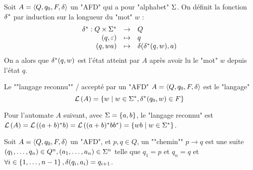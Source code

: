 \begin{definition}
	Soit $A = \langle Q, q_0, F, \delta \rangle$ un "AFD" qui a pour "alphabet" $\Sigma$. On définit la fonction $\delta^{*}$ par induction sur la longueur du "mot" $w$ :
	$$ \begin{array}{rcl}
			\delta^{*} : Q \times \Sigma^{*} & \to     & Q                               \\
			(q, \varepsilon)                   & \mapsto & q                               \\
			(q, wa)                         & \mapsto & \delta(\delta^{*}(q, w), a)
		\end{array} $$
	On a alors que $\delta^{*}(q, w)$ est l'état atteint par $A$ après avoir lu le "mot" $w$ depuis l'état $q$.
\end{definition}

\begin{definition}
	Le ""langage reconnu"" / accepté par un "AFD" $A = \langle Q, q_0, F, \delta \rangle$ est le "langage"
	$$ \mathcal{L}\left(A\right) = \left\{w \mid w \in \Sigma^{*}, \delta^{*}(q_0, w) \in F\right\} $$
\end{definition}

\begin{exemple}
	Pour l'automate $A$ suivant, avec $\Sigma = \left\{a,b\right\}$, le "langage reconnu" est
	$\mathcal{L}\left(A\right) = \mathcal{L}\left((a + b)^{*} b\right) = \mathcal{L}\left((a + b)^{*} b b^{*}\right) = \left\{wb \mid w \in \Sigma^{*}\right\}$.

	\begin{center}
		\begin{automata}
		\end{automata}
	\end{center}
\end{exemple}


\begin{definition}[chemin]
	Soit $A = \langle Q, q_0, F, \delta \rangle$ un "AFD", et $p,q \in Q$, un ""chemin"" $p \to q$ est une suite
	$(q_1, \ldots, q_n)\in Q^n,(a_1, \ldots, a_n)\in \Sigma^n$ telle que $q_1 = p$ et $q_n = q$ et
	$\forall i \in \left\{1,\ldots,n-1\right\}, \delta(q_i, a_i) = q_{i+1}$.
\end{definition}

